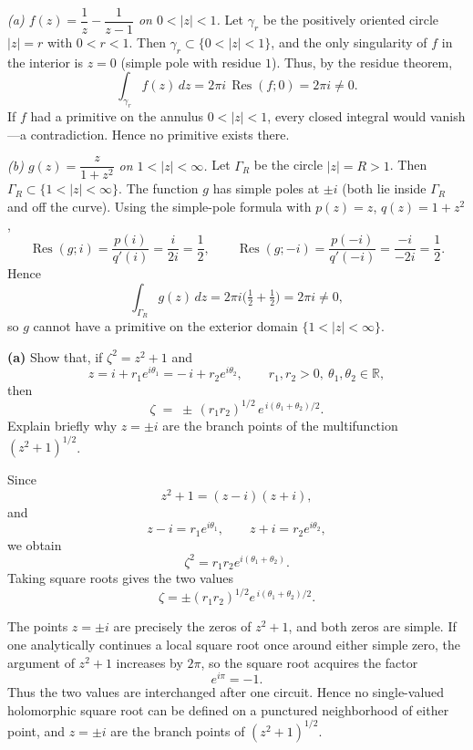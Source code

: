 \begin{solution}
\emph{(a) $f(z)=\dfrac{1}{z}-\dfrac{1}{z-1}$ on $0<|z|<1$.}
Let $\gamma_r$ be the positively oriented circle $|z|=r$ with $0<r<1$. Then $\gamma_r\subset\{0<|z|<1\}$,
and the only singularity of $f$ in the interior is $z=0$ (simple pole with residue $1$). Thus, by the residue theorem,
\[
\int_{\gamma_r} f(z)\,dz
= 2\pi i\,\operatorname{Res}(f;0)
= 2\pi i \neq 0.
\]
If $f$ had a primitive on the annulus $0<|z|<1$, every closed integral would vanish—a contradiction. Hence no primitive exists there.

\medskip
\emph{(b) $g(z)=\dfrac{z}{1+z^{2}}$ on $1<|z|<\infty$.}
Let $\Gamma_R$ be the circle $|z|=R>1$. Then $\Gamma_R\subset\{1<|z|<\infty\}$.
The function $g$ has simple poles at $\pm i$ (both lie inside $\Gamma_R$ and off the curve).
Using the simple-pole formula with $p(z)=z$, $q(z)=1+z^2$,
\[
\operatorname{Res}(g;i)=\frac{p(i)}{q'(i)}=\frac{i}{2i}=\frac{1}{2},\qquad
\operatorname{Res}(g;-i)=\frac{p(-i)}{q'(-i)}=\frac{-i}{-2i}=\frac{1}{2}.
\]
Hence
\[
\int_{\Gamma_R} g(z)\,dz = 2\pi i\Big(\tfrac12+\tfrac12\Big)=2\pi i\neq 0,
\]
so $g$ cannot have a primitive on the exterior domain $\{1<|z|<\infty\}$.
\end{solution}

\begin{problem}[CP-IV-0043]
\label{prob:cp-iv-0043}
\par\noindent\textbullet\quad \textbf{(a)}\;
	Show that, if \(\zeta^{2}=z^{2}+1\) and
	\[
	z = i + r_{1}e^{i\theta_{1}} = -\,i + r_{2}e^{i\theta_{2}},
	\qquad r_{1},r_{2}>0,\ \theta_{1},\theta_{2}\in\mathbb{R},
	\]
	then
	\[
	\zeta \;=\; \pm\,(r_{1}r_{2})^{1/2}\,e^{\,i(\theta_{1}+\theta_{2})/2}.
	\]
	Explain briefly why \(z=\pm i\) are the branch points of the multifunction \((z^{2}+1)^{1/2}\).

	\medskip
\end{problem}

\begin{solution}
Since
\[
z^2+1=(z-i)(z+i),
\]
and
\[
z-i=r_1e^{i\theta_1},
\qquad
z+i=r_2e^{i\theta_2},
\]
we obtain
\[
\zeta^2
=
r_1r_2e^{i(\theta_1+\theta_2)}.
\]
Taking square roots gives the two values
\[
\boxed{
\zeta
=
\pm (r_1r_2)^{1/2}
e^{\,i(\theta_1+\theta_2)/2}.
}
\]

The points \(z=\pm i\) are precisely the zeros of \(z^2+1\), and both zeros are simple. If one analytically continues a local square root once around either simple zero, the argument of \(z^2+1\) increases by \(2\pi\), so the square root acquires the factor
\[
e^{i\pi}=-1.
\]
Thus the two values are interchanged after one circuit. Hence no single-valued holomorphic square root can be defined on a punctured neighborhood of either point, and \(z=\pm i\) are the branch points of \((z^2+1)^{1/2}\).
\end{solution}


